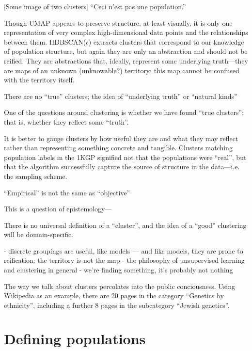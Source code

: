 [Some image of two clusters]
``Ceci n'est pas une population.''

Though UMAP appears to preserve structure, at least visually, it is only one representation of very complex high-dimensional data points and the relationships between them. HDBSCAN($\hat{\epsilon}$) extracts clusters that correspond to our knowledge of population structure, but again they are only an abstraction and should not be reified. They are abstractions that, ideally, represent some underlying truth---they are maps of an unknown (unknowable?) territory; this map cannot be confused with the territory itself. 

There are no ``true'' clusters; the idea of ``underlying truth'' or ``natural kinds''



One of the questions around clustering is whether we have found ``true clusters''; that is, whether they reflect some ``truth''. 

It is better to gauge clusters by how useful they are and what they may reflect rather than representing something concrete and tangible. Clusters matching population labels in the 1KGP signified not that the populations were ``real'', but that the algorithm successfully capture the source of structure in the data---i.e. the sampling scheme.

``Empirical'' is not the same as ``objective''

\citep{lewis_human_2012}

This is a question of epistemology---

There is no universal definition of a ``cluster'', and the idea of a ``good'' clustering will be domain-specific\citep{hennig_what_2015}.

- discrete groupings are useful, like models --- and like models, they are prone to reification: the territory is not the map
- the philosophy of unsupervised learning and clustering in general
- we're finding something, it's probably not nothing

The way we talk about clusters percolates into the public conciousness. Using Wikipedia as an example, there are $20$ pages in the category ``Genetics by ethnicity'', including a further $8$ pages in the subcategory ``Jewish genetics''.



\clearpage

\section{Defining populations}

